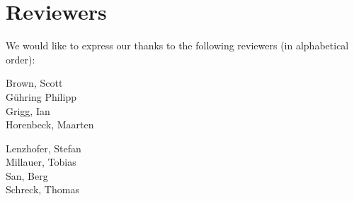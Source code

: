 \section{Reviewers}

We would like to express our thanks to the following reviewers (in alphabetical order):


\vline{}

\begin{minipage}[b]{0.5\linewidth}
\center
Brown, Scott \\
G\"uhring Philipp  \\
Grigg, Ian  \\
Horenbeck, Maarten \\
\end{minipage}
\begin{minipage}[b]{0.5\linewidth}
\center
Lenzhofer, Stefan \\
Millauer, Tobias \\
San, Berg \\
Schreck, Thomas  \\
\end{minipage}


